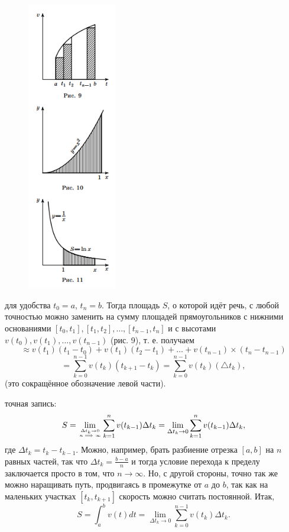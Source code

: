 \documentclass[16pt]{article}
\begin{document}
\begin{figure}
  \centering
  \includegraphics[width=0.35\textwidth]{Pic9-11.png}

\end{figure}
 для удобства $t_0 = a$, $t_n = b$. 
Тогда площадь $S$, о которой идёт речь, с любой точностью можно заменить на сумму площадей прямоугольников с нижними основаниями $[t_0, t_1], [t_1, t_2], \ldots, [t_{n-1}, t_n]$ и с высотами $v(t_0), v(t_1), \ldots, v(t_{n-1})$ (рис. 9), т. е. получаем
\[
 \approx v(t_1)(t_1 - t_0) + v(t_1)(t_2 - t_1) + \ldots + v(t_{n-1})\times(t_n - t_{n-1})\]
\[
= \sum_{k=0}^{n-1} v(t_{k}) (t_{k+1} - t_{k}) = \sum_{k=0}^{n-1} v(t_{k}) (\bigtriangleup{t_{k}}),
\]
(это сокращённое обозначение левой части).

 точная запись:
\[
S = \lim_{\Delta t_k \to 0 \atop n \implies \infty} \sum_{k=1}^{n} v(t_{k-1}) \Delta t_k = \lim_{\Delta t_k \to 0} \sum_{k=1}^{n} v(t_{k-1}) \Delta t_k,
\]
где $\Delta t_k = t_k - t_{k-1}$. Можно, например, брать разбиение отрезка $[a, b]$ на $n$ равных частей, так что $\Delta t_k = \frac{b - a}{n}$ и тогда условие перехода к пределу заключается просто в том, что $n \to \infty$. Но, с другой стороны, точно так же можно наращивать путь, продвигаясь в промежутке от $a$ до $b$, так как на маленьких участках $[t_k, t_{k+1}]$ скорость можно считать постоянной. Итак,
\\
\[
S = \int_a^b v(t) dt = \lim_{\Delta t_k \to 0} \sum_{k=0}^{n-1} v(t_k) \Delta t_k.
\]
\end{document}
